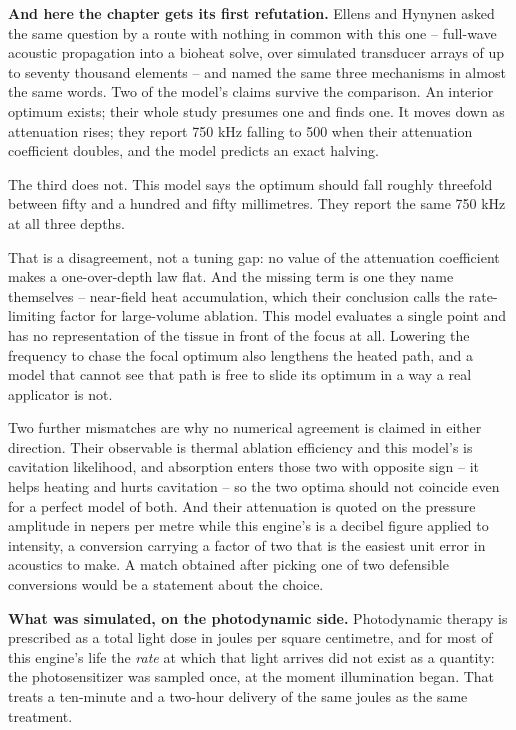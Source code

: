 \documentclass[11pt,twoside,openright]{report}
\begin{document}
\textbf{And here the chapter gets its first refutation.} Ellens and Hynynen asked the same question by a route with nothing in common with this one -- full-wave acoustic propagation into a bioheat solve, over simulated transducer arrays of up to seventy thousand elements -- and named the same three mechanisms in almost the same words. Two of the model's claims survive the comparison. An interior optimum exists; their whole study presumes one and finds one. It moves down as attenuation rises; they report 750 kHz falling to 500 when their attenuation coefficient doubles, and the model predicts an exact halving.

The third does not. This model says the optimum should fall roughly threefold between fifty and a hundred and fifty millimetres. They report the same 750 kHz at all three depths.

\begin{refusal}
That is a disagreement, not a tuning gap: no value of the attenuation coefficient makes a one-over-depth law flat. And the missing term is one they name themselves -- near-field heat accumulation, which their conclusion calls the rate-limiting factor for large-volume ablation. This model evaluates a single point and has no representation of the tissue in front of the focus at all. Lowering the frequency to chase the focal optimum also lengthens the heated path, and a model that cannot see that path is free to slide its optimum in a way a real applicator is not.

Two further mismatches are why no numerical agreement is claimed in either direction. Their observable is thermal ablation efficiency and this model's is cavitation likelihood, and absorption enters those two with opposite sign -- it helps heating and hurts cavitation -- so the two optima should not coincide even for a perfect model of both. And their attenuation is quoted on the pressure amplitude in nepers per metre while this engine's is a decibel figure applied to intensity, a conversion carrying a factor of two that is the easiest unit error in acoustics to make. A match obtained after picking one of two defensible conversions would be a statement about the choice.
\end{refusal}

\textbf{What was simulated, on the photodynamic side.} Photodynamic therapy is prescribed as a total light dose in joules per square centimetre, and for most of this engine's life the \textit{rate} at which that light arrives did not exist as a quantity: the photosensitizer was sampled once, at the moment illumination began. That treats a ten-minute and a two-hour delivery of the same joules as the same treatment.
\end{document}
